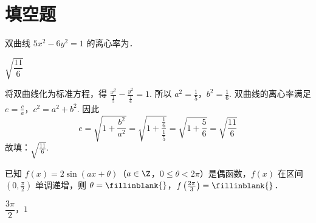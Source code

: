 \section{填空题}

\begin{problem}
双曲线 \(5x^2-6y^2=1\) 的离心率为\fillinblank{}．
\end{problem}

\begin{answer}
\(\sqrt{\dfrac{11}{6}}\)
\end{answer}

\begin{solution}
将双曲线化为标准方程，得 \(\frac{x^2}{\frac{1}{5}}-\frac{y^2}{\frac{1}{6}}=1\). 所以 \(a^2=\frac{1}{5}\)，\(b^2=\frac{1}{6}\). 双曲线的离心率满足 \(e=\frac{c}{a}\)，\(c^2=a^2+b^2\). 因此
\[
e=\sqrt{1+\frac{b^2}{a^2}}=\sqrt{1+\frac{\frac{1}{6}}{\frac{1}{5}}}=\sqrt{1+\frac{5}{6}}=\sqrt{\frac{11}{6}}
\]
故填：\(\sqrt{\frac{11}{6}}\).
\end{solution}

\begin{problem}
已知 \(f(x)=2\sin(ax+\theta)\)（\(a\in\Z\)，\(0\le \theta<2\pi\)）是偶函数，\(f(x)\) 在区间 \(\left( 0,\frac{\pi}{2} \right)\) 单调递增，则 \(\theta=\fillinblank{}\)，\(f\left( \frac{2\pi}{3} \right)=\fillinblank{}\)．
\end{problem}

\begin{answer}
\(\dfrac{3\pi}{2}\)，\(1\)
\end{answer}

